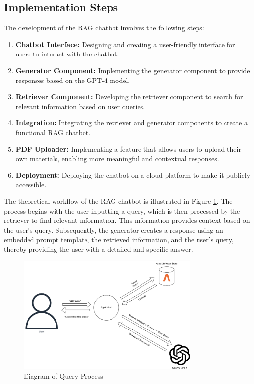     \subsection{Implementation Steps}
    The development of the RAG chatbot involves the following steps:
    \begin{enumerate}
        \item \textbf{Chatbot Interface:} Designing and creating a user-friendly interface for users to interact with the chatbot.
        \item \textbf{Generator Component:} Implementing the generator component to provide responses based on the GPT-4 model.
        \item \textbf{Retriever Component:} Developing the retriever component to search for relevant information based on user queries.
        \item \textbf{Integration:} Integrating the retriever and generator components to create a functional RAG chatbot.
        \item \textbf{PDF Uploader:} Implementing a feature that allows users to upload their own materials, enabling more meaningful and contextual responses.
        \item \textbf{Deployment:} Deploying the chatbot on a cloud platform to make it publicly accessible.
    \end{enumerate}
        
    The theoretical workflow of the RAG chatbot is illustrated in Figure \ref{fig:rag_chatbot}. The process begins with the user inputting a query, which is then processed by the retriever to find relevant information. This information provides context based on the user's query. Subsequently, the generator creates a response using an embedded prompt template, the retrieved information, and the user's query, thereby providing the user with a detailed and specific answer.
    
    \begin{figure}[H]
        \centering
        \includegraphics[width=0.8\textwidth]{figs/Chatbot_process.png}
        \caption{Diagram of Query Process}
        \label{fig:rag_chatbot}
    \end{figure}


